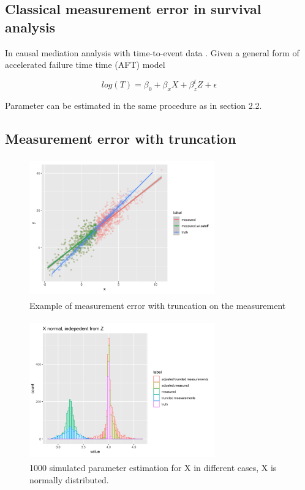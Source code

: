 \documentclass{article}
\begin{document}




\subsection{Classical measurement error in survival analysis}

In causal mediation analysis with time-to-event data \cite{vanderweele2011causal}. Given a general form of accelerated failure time time  (AFT) model

\begin{equation}
log(T) = \beta_0 + \beta_x   X + \beta_{z}^t Z + \epsilon
\end{equation}


Parameter can be estimated in the same procedure as in section 2.2.



\subsection{Measurement error with truncation}

\begin{figure}[h]
\centering
\includegraphics[width = 8cm,height = 6cm]{figure-2.png}
\caption{Example of measurement error with truncation on the measurement}
\label{fig2}
\end{figure}



\begin{figure}[h]
\centering
\includegraphics[width = 8cm,height = 6cm]{figure-3.png}
\caption{1000 simulated parameter estimation for X in different cases, X is normally distributed. }
\label{fig3}
\end{figure}
\end{document}

